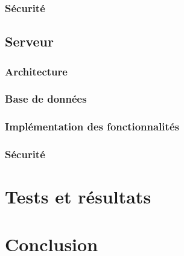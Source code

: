 \subsection{Sécurité}
\newpage
\section{Serveur}

\subsection{Architecture}
\subsection{Base de données}
\subsection{Implémentation des fonctionnalités}
\subsection{Sécurité}

\chapter{Tests et résultats}


\chapter{Conclusion}
